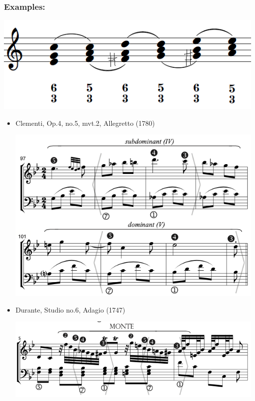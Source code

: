 ﻿\documentclass[11pt, openany]{article}
\begin{document}
\begin{itemize}
\subsubsection{Examples:}
\begin{center}
\includegraphics[scale=0.5]{monte.png}
\end{center}
\begin{itemize}
\item Clementi, Op.4, no.5, mvt.2, Allegretto (1780)
\begin{center}
\includegraphics[scale=0.5]{clementi4b.png}
\end{center}
\item Durante, Studio no.6, Adagio (1747)
\begin{center}
\includegraphics[scale=0.5]{durante6.png}

\end{center}
\end{itemize}
\end{itemize}
\end{document}

